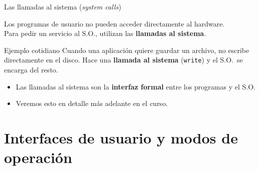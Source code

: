 \documentclass[xcolor=svgnames]{beamer}
\begin{document}
\begin{frame}{Las llamadas al sistema (\textit{system calls})}

  Los programas de usuario no pueden acceder directamente al hardware.\\
  Para pedir un servicio al S.O., utilizan las \textbf{llamadas al sistema}.

  \vspace{0.3cm}

  \begin{exampleblock}{Ejemplo cotidiano}
    Cuando una aplicación quiere guardar un archivo, no escribe directamente en el disco. Hace una \textbf{llamada al sistema} (\texttt{write}) y el S.O.\ se encarga del resto.
  \end{exampleblock}

  \vspace{0.3cm}

  \begin{itemize}
    \item Las llamadas al sistema son la \textbf{interfaz formal} entre los programas y el S.O.
    \item Veremos esto en detalle más adelante en el curso.
  \end{itemize}

\end{frame}

\section{Interfaces de usuario y modos de operación}
\end{document}
